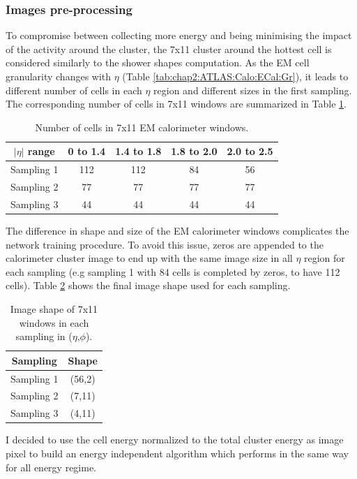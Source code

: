 \subsubsection{Images pre-processing}
\label{gamma:CNN:PreProcessing}
To compromise between collecting more energy and being minimising the impact of the activity around the cluster, the 7x11 cluster around the hottest cell is considered similarly to the shower shapes computation. As the EM cell granularity changes with $\eta$ (Table \ref{tab:chap2:ATLAS:Calo:ECal:Gr}), it leads to different number of cells in each $\eta$ region and different sizes in the first sampling. The corresponding number of cells in 7x11 windows are summarized in Table \ref{tab:gamma:CNN:PreProcessing:NCells}.
\begin{table}[htbp]
    \centering
    \begin{tabular}{ccccc}
    \hline
        $|\eta|$ range & 0 to 1.4 & 1.4 to 1.8 & 1.8 to 2.0 & 2.0 to 2.5 \\
    \hline
        Sampling 1 & 112 & 112 & 84 & 56 \\
        Sampling 2 & 77 & 77 & 77 & 77 \\
        Sampling 3 & 44 & 44 & 44 & 44 \\
    \hline
    \end{tabular}
    \caption{Number of cells in 7x11 EM calorimeter windows.}
    \label{tab:gamma:CNN:PreProcessing:NCells}
\end{table}
The difference in shape and size of the EM calorimeter windows complicates the network training procedure. To avoid this issue, zeros are appended to the calorimeter cluster image to end up with the same image size in all $\eta$ region for each sampling (e.g sampling 1 with 84 cells is completed by zeros, to have 112 cells). Table \ref{tab:gamma:CNN:PreProcessing:ImgSize} shows the final image shape used for each sampling.
\begin{table}[htbp]
    \centering
    \begin{tabular}{cc}
    \hline
        Sampling & Shape \\
    \hline
        Sampling 1 & (56,2)\\
        Sampling 2 & (7,11)  \\
        Sampling 3 & (4,11) \\
    \hline
    \end{tabular}
    \caption{Image shape of 7x11 windows in each sampling in ($\eta$,$\phi$).}
    \label{tab:gamma:CNN:PreProcessing:ImgSize}
\end{table}
I decided to use the cell energy normalized to the total cluster energy as image pixel to build an energy independent algorithm which performs in the same way for all energy regime.
